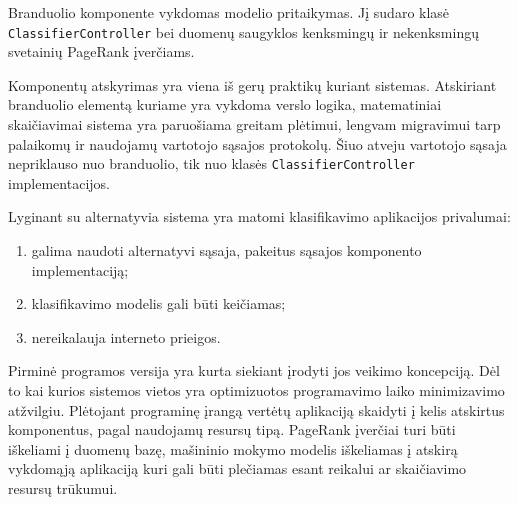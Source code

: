 Branduolio komponente vykdomas modelio pritaikymas. Jį sudaro klasė \texttt{ClassifierController} bei duomenų
saugyklos kenksmingų ir nekenksmingų svetainių PageRank įverčiams.

Komponentų atskyrimas yra viena iš gerų praktikų kuriant sistemas. Atskiriant branduolio elementą kuriame yra
vykdoma verslo logika, matematiniai skaičiavimai sistema yra paruošiama greitam plėtimui, lengvam migravimui
tarp palaikomų ir naudojamų vartotojo sąsajos protokolų. Šiuo atveju vartotojo sąsaja nepriklauso nuo
branduolio, tik nuo klasės \texttt{ClassifierController} implementacijos.

Lyginant su alternatyvia sistema \cite{gapi} yra matomi klasifikavimo aplikacijos privalumai:
 \begin{enumerate}
    \item galima naudoti alternatyvi sąsaja, pakeitus sąsajos komponento implementaciją;
    \item klasifikavimo modelis gali būti keičiamas;
    \item nereikalauja interneto prieigos.
 \end{enumerate}

Pirminė programos versija yra kurta siekiant įrodyti jos veikimo koncepciją. Dėl to kai kurios sistemos vietos
yra optimizuotos programavimo laiko minimizavimo atžvilgiu. Plėtojant programinę įrangą vertėtų aplikaciją
skaidyti į kelis atskirtus komponentus, pagal naudojamų resursų tipą. PageRank įverčiai turi būti iškeliami
į duomenų bazę, mašininio mokymo modelis iškeliamas į atskirą vykdomąją aplikaciją kuri gali būti plečiamas
esant reikalui ar skaičiavimo resursų trūkumui.